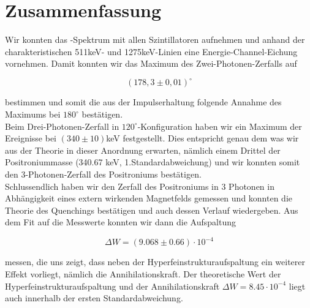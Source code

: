 \section{Zusammenfassung}

Wir konnten das \Na-Spektrum mit allen Szintillatoren aufnehmen und anhand der charakteristischen 511keV- und 1275keV-Linien eine Energie-Channel-Eichung vornehmen. Damit konnten wir das Maximum des Zwei-Photonen-Zerfalls auf 

$$(178,3 \pm 0,01)^\circ$$

bestimmen und somit die aus der Impulserhaltung folgende Annahme des Maximums bei $180^\circ$ bestätigen.\\ 

Beim Drei-Photonen-Zerfall in $120^\circ$-Konfiguration haben wir ein Maximum der Ereignisse bei $(340 \pm 10)$keV festgestellt. Dies entspricht genau dem was wir aus der Theorie in dieser Anordnung erwarten, nämlich einem Drittel der Positroniummasse (340.67 keV, 1.Standardabweichung) und wir konnten somit den 3-Photonen-Zerfall des Positroniums bestätigen.\\

Schlussendlich haben wir den Zerfall des Positroniums in 3 Photonen in Abhängigkeit eines extern wirkenden Magnetfelds gemessen und konnten die Theorie des Quenchings bestätigen und auch dessen Verlauf wiedergeben. Aus dem Fit auf die Messwerte konnten wir dann die Aufspaltung

$$\Delta W = (9.068 \pm 0.66) \cdot 10^{-4} $$

messen, die uns zeigt, dass neben der Hyperfeinstrukturaufspaltung ein weiterer Effekt vorliegt, nämlich die Annihilationskraft. Der theoretische Wert der Hyperfeinstrukturaufspaltung und der Annihilationskraft $\Delta W =8.45\cdot10^{-4}$ liegt auch innerhalb der ersten Standardabweichung.